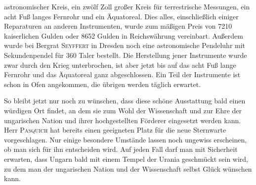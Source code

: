 {
astronomischer Kreis, ein zwölf Zoll großer Kreis für terrestrische Messungen, ein acht Fuß langes Fernrohr und ein Äquatoreal. Dies alles, einschließlich einiger Reparaturen an anderen Instrumenten, wurde zum mäßigen Preis von 7210 kaiserlichen Gulden oder 8652 Gulden in Reichswährung vereinbart. Außerdem wurde bei Bergrat \textsc{Seyffert} in Dresden noch eine astronomische Pendeluhr mit Sekundenpendel für 360 Taler bestellt. Die Herstellung jener Instrumente wurde zwar durch den Krieg unterbrochen, ist aber jetzt bis auf das acht Fuß lange Fernrohr und das Äquatoreal ganz abgeschlossen. Ein Teil der Instrumente ist schon in Ofen angekommen, die übrigen werden täglich erwartet.\par}

So bleibt jetzt nur noch zu wünschen, dass diese schöne Ausstattung bald einen würdigen Ort findet, an dem sie zum Wohl der Wissenschaft und zur Ehre der ungarischen Nation und ihrer hochgestellten Förderer eingesetzt werden kann. Herr \textsc{Pasquich} hat bereits einen geeigneten Platz für die neue Sternwarte vorgeschlagen. Nur einige besondere Umstände lassen noch ungewiss erscheinen, ob man sich für ihn entscheiden wird. Auf jeden Fall darf man mit Sicherheit erwarten, dass Ungarn bald mit einem Tempel der Urania geschmückt sein wird, zu dem man der ungarischen Nation und der Wissenschaft selbst Glück wünschen kann.
